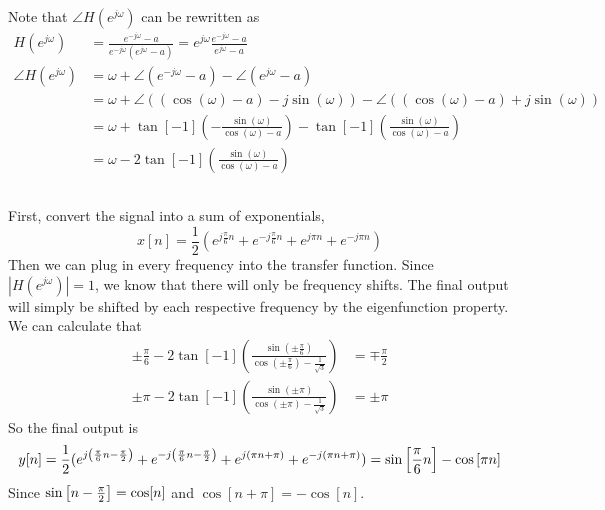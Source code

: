 \documentclass{article}
\begin{document}
\subsection{}

Note that \(\angle H(e^{j \omega})\) can be rewritten as
\begin{align}
    H(e^{j \omega}) &= \frac{e^{-j \omega} - a}{e^{-j \omega} (e^{j \omega} - a)} = e^{j \omega} \frac{e^{-j \omega} - a}{e^{j \omega} - a} \\
    \angle H(e^{j \omega}) &= \omega + \angle(e^{-j \omega} - a) - \angle(e^{j \omega} - a) \\
    &= \omega + \angle((\cos(\omega) - a) - j \sin(\omega)) - \angle ((\cos(\omega) - a) + j \sin(\omega)) \\
    &= \omega + \tan[-1](-\frac{\sin(\omega)}{\cos(\omega) - a}) - \tan[-1](\frac{\sin(\omega)}{\cos(\omega) - a}) \\
    &= \omega - 2\tan[-1](\frac{\sin(\omega)}{\cos(\omega) - a})
\end{align}

\subsection{}

First, convert the signal into a sum of exponentials,
\begin{equation}
    x[n] = \frac{1}{2} (e^{j \frac{\pi}{6} n} + e^{-j \frac{\pi}{6} n} + e^{j \pi n} + e^{-j \pi n})
\end{equation}
Then we can plug in every frequency into the transfer function.
Since \(|H(e^{j \omega})| = 1\), we know that there will only be frequency shifts.
The final output will simply be shifted by each respective frequency by the eigenfunction property.
We can calculate that
\begin{align}
    \pm \frac{\pi}{6} - 2\tan[-1](\frac{\sin(\pm \frac{\pi}{6})}{\cos(\pm \frac{\pi}{6}) - \frac{1}{\sqrt{3}}}) &= \mp \frac{\pi}{2} \\
    \pm \pi - 2\tan[-1](\frac{\sin(\pm \pi)}{\cos(\pm \pi) - \frac{1}{\sqrt{3}}}) &= \pm \pi
\end{align}
So the final output is
\begin{equation}
    y[n] = \frac{1}{2} (e^{j \qty(\frac{\pi}{6} n - \frac{\pi}{2})} + e^{-j \qty(\frac{\pi}{6} n - \frac{\pi}{2})} + e^{j \qty(\pi n + \pi)} + e^{-j \qty(\pi n + \pi)}) = \sin\qty[\frac{\pi}{6} n] - \cos\qty[\pi n]
\end{equation}
Since \(\sin\qty[n - \frac{\pi}{2}] = \cos[n]\) and \(\cos[n + \pi] = -\cos[n]\).
\end{document}
